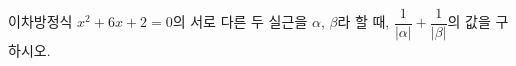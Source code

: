 이차방정식 $x^2+6x+2=0$의 서로 다른 두 실근을 $\alpha$, $\beta$라 할 때, $\dfrac{1}{|\alpha|}+\dfrac{1}{|\beta|}$의 값을 구하시오.
